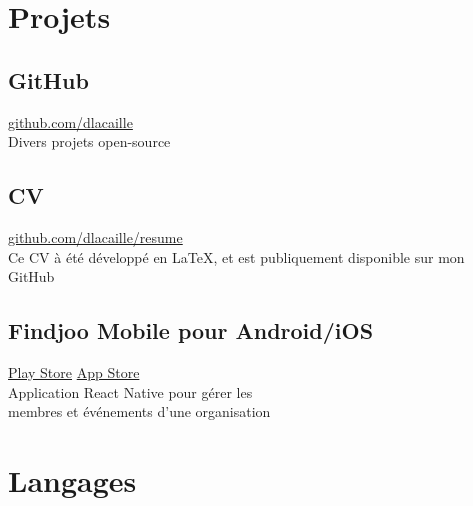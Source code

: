 \documentclass{article}
\begin{document}
\begin{paracol}{2}
\begin{leftcolumn}
    \section{Projets}

    \subsection{GitHub}
    \href{https://github.com/dlacaille}{\faGithub\hspace{0.5em}github.com/dlacaille}\\
    Divers projets open-source
    
    \vspace{0.5em}
    
    \subsection{CV}
    \href{https://github.com/dlacaille/resume}{\faNewspaper[regular]\hspace{0.5em}github.com/dlacaille/resume}\\
    Ce CV à été développé en LaTeX, et est publiquement disponible sur mon GitHub

    \vspace{0.5em}

    \subsection{Findjoo Mobile pour Android/iOS}
    \href{https://play.google.com/store/apps/details?id=com.findjoomobile}{\faGooglePlay\hspace{0.5em}Play Store}\hspace{1em}
    \href{https://apps.apple.com/us/app/findjoo/id1499583717}{\faAppStore\hspace{0.5em}App Store}\\
    Application React Native pour gérer les \\
    membres et événements d'une organisation

    \section{Langages}


\end{leftcolumn}
\end{paracol}
\end{document}
